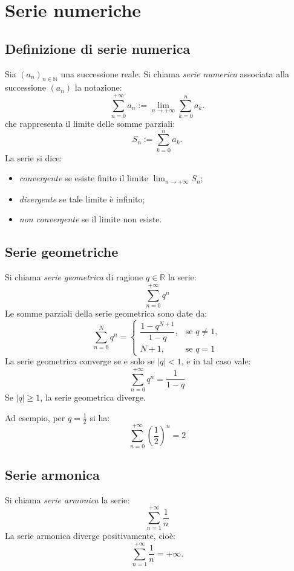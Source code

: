 \documentclass[a4paper,12pt,openright]{book}
\begin{document}
	\chapter{Serie numeriche}
	
	\section{Definizione di serie numerica}
	Sia $(a_n)_{n \in \mathbb{N}}$ una successione reale.  
	Si chiama \emph{serie numerica} associata alla successione $(a_n)$ la notazione:
	\[
	\sum_{n=0}^{+\infty} a_n := \lim_{n \to +\infty} \sum_{k=0}^{n} a_k.
	\]
	che rappresenta il limite delle somme parziali:
	\[
	S_n := \sum_{k=0}^{n} a_k.
	\]
	La serie si dice:
	\begin{itemize}
		\item \emph{convergente} se esiste finito il limite $\displaystyle \lim_{n \to +\infty} S_n$;
		\item \emph{divergente} se tale limite è infinito;
		\item \emph{non convergente} se il limite non esiste.
	\end{itemize}
	
	\section{Serie geometriche}
	Si chiama \emph{serie geometrica} di ragione $q \in \mathbb{R}$ la serie:
	\[\sum_{n=0}^{+\infty} q^n\]
	Le somme parziali della serie geometrica sono date da:
	\[
	\sum_{n=0}^{N} q^n =
	\begin{cases}
		\dfrac{1 - q^{N+1}}{1 - q}, & \text{se } q \neq 1, \\[8pt]
		N+1, & \text{se } q = 1
	\end{cases}
	\]
	La serie geometrica converge se e solo se $|q| < 1$, e in tal caso vale:
	\[\sum_{n=0}^{+\infty} q^n = \frac{1}{1 - q}\]
	Se $|q| \geq 1$, la serie geometrica diverge.
		
	Ad esempio, per $q = \frac{1}{2}$ si ha:
	\[\sum_{n=0}^{+\infty} \left(\frac{1}{2}\right)^n = 2\]
	
	\section{Serie armonica}
	Si chiama \emph{serie armonica} la serie:
	\[\sum_{n=1}^{+\infty} \frac{1}{n}\]
	La serie armonica diverge positivamente, cioè:
	\[
	\sum_{n=1}^{+\infty} \frac{1}{n} = +\infty.
	\]
	
\end{document}

